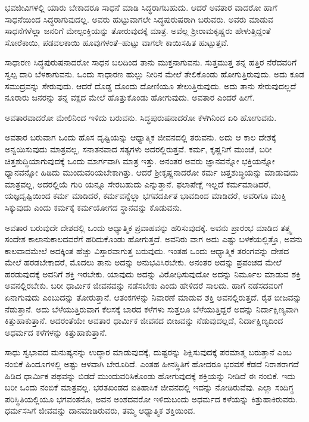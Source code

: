 ಭವಜೀವಿಗಳಲ್ಲಿ ಯಾರು ಬೇಕಾದರೂ ಸಾಧನೆ ಮಾಡಿ ಸಿದ್ಧರಾಗಬಹುದು. ಆದರೆ ಅವತಾರ ವಾದರೋ ಹಾಗೆ ಸಾಧನೆಯಿಂದ ಸಿದ್ಧರಾಗುವುದಲ್ಲ. ಅವರು ಹುಟ್ಟುವಾಗಲೇ ಸಿದ್ಧಪುರುಷರಾಗಿ ಬರುವರು. ಅವರು ಮಾಡುವ ಸಾಧನೆಗಳೆಲ್ಲಾ ಜನರಿಗೆ ಮೇಲ್ಪಂಕ್ತಿಯನ್ನು ತೋರುವುದಕ್ಕೆ ಮಾತ್ರ. ಅವೆಲ್ಲ ಶ್ರೀರಾಮಕೃಷ್ಣರು ಹೇಳುತ್ತಿದ್ದಂತೆ ಸೋರೆಕಾಯಿ, ಪಡವಲಕಾಯಿ ಹೂವುಗಳಂತೆ–ಹುಟ್ಟು ವಾಗಲೇ ಕಾಯಿಸಹಿತ ಹುಟ್ಟುತ್ತವೆ.

ಸಾಧಾರಣ ಸಿದ್ಧಪುರುಷನಾದರೋ ಸಾಧನ ಬಲದಿಂದ ತಾನು ಮುಕ್ತನಾಗುವನು. ಸುತ್ತಮುತ್ತ ತನ್ನ ಹತ್ತಿರ ನೆರೆದವರಿಗೆ ಸ್ವಲ್ಪ ದಾರಿ ಬೆಳಕಾಗುವನು. ಒಂದು ಸಾಧಾರಣ ಹುಲ್ಲು ನೀರಿನ ಮೇಲೆ ತೇಲಿಕೊಂಡು ಹೋಗುತ್ತಿರುವುದು. ಅದು ಕೂಡ ಸಮುದ್ರವನ್ನು ಸೇರುವುದು. ಆದರೆ ದೊಡ್ಡ ದೊಂದು ದೋಣಿಯೂ ತೇಲುತ್ತಿರುವುದು. ಅದು ತಾನು ಸೇರುವುದಲ್ಲದೆ ನೂರಾರು ಜನರನ್ನು ತನ್ನ ವಕ್ಷದ ಮೇಲೆ ಹೊತ್ತುಕೊಂಡು ಹೋಗುವುದು. ಅವತಾರ ಎಂದರೆ ಹೀಗೆ.

ಅವತಾರವಾದರೋ ಮೇಲಿನಿಂದ ಇಳಿದು ಬರುವನು. ಸಿದ್ಧಪುರುಷನಾದರೋ ಕೆಳಗಿನಿಂದ ಏರಿ ಹೋಗುವನು.

ಅವತಾರ ಬರುವಾಗ ಒಂದು ಹೊಸ ದೃಷ್ಟಿಯನ್ನು ಆಧ್ಯಾತ್ಮಿಕ ಜೀವನದಲ್ಲಿ ತರುವನು. ಅದು ಆ ಕಾಲ ದೇಶಕ್ಕೆ ಅನ್ವಯಿಸುವುದು ಮಾತ್ರವಲ್ಲ, ಸನಾತನವಾದ ಸತ್ಯಗಳು ಅದರಲ್ಲಿರುತ್ತವೆ. ಕರ್ಮ, ಕೃಷ್ಣನಿಗೆ ಮುಂಚೆ, ಬರೀ ಚಿತ್ತಶುದ್ಧಿಯಾಗುವುದಕ್ಕೆ ಒಂದು ಮಾರ್ಗವಾಗಿ ಮಾತ್ರ ಇತ್ತು. ಅನಂತರ ಅವರು ಜ್ಞಾನವನ್ನೋ ಭಕ್ತಿಯನ್ನೋ ಧ್ಯಾನವನ್ನೋ ಹಿಡಿದು ಮುಂದುವರಿಯಬೇಕಾಗಿತ್ತು. ಆದರೆ ಶ್ರೀಕೃಷ್ಣನಾದರೋ ಕರ್ಮ ಚಿತ್ತಶುದ್ಧಿಯನ್ನು ಮಾಡುವುದು ಮಾತ್ರವಲ್ಲ, ಅದರಲ್ಲಿಯೆ ಗುರಿ ಯನ್ನೂ ಸೇರಬಹುದು ಎನ್ನುತ್ತಾನೆ. ಫಲಾಪೇಕ್ಷೆ ಇಲ್ಲದೆ ಕರ್ಮಮಾಡಿದರೆ, ಯಜ್ಞದೃಷ್ಟಿಯಿಂದ ಕರ್ಮ ಮಾಡಿದರೆ, ಕರ್ಮವನ್ನೆಲ್ಲಾ ಭಗವದರ್ಪಿತ ಭಾವದಿಂದ ಮಾಡಿದರೆ, ಅವರಿಗೂ ಮುಕ್ತಿ ಸಿಕ್ಕುವುದು ಎಂದು ಕರ್ಮಕ್ಕೆ ಕರ್ಮಯೋಗದ ಸ್ಥಾನವನ್ನು ಕೊಡುವನು.

ಅವತಾರ ಬರುವುದೇ ದೇಶದಲ್ಲಿ ಒಂದು ಆಧ್ಯಾತ್ಮಿಕ ಪ್ರವಾಹವನ್ನು ಹರಿಸುವುದಕ್ಕೆ. ಅವನು ಪ್ರಾರಂಭ ಮಾಡಿದ ತತ್ತ್ವ ಸಂದೇಶ ಕಾಲಾನುಕಾಲದವರೆಗೆ ಹರಿದುಕೊಂಡು ಹೋಗುತ್ತದೆ. ಅವನಿರು ವಾಗ ಅದು ಎಷ್ಟು ಬಳಕೆಯಲ್ಲಿತ್ತೊ, ಅವನು ಕಾಲವಾದಮೇಲೆ ಅದಕ್ಕಿಂತ ಹೆಚ್ಚು ವಿಸ್ತಾರವಾಗುತ್ತ ಬರುವುದು. ಇಂತಹ ಒಂದು ಆಧ್ಯಾತ್ಮಿಕ ತರಂಗವನ್ನು ದೇಶದ ಮೇಲೆ ಹರಡಬೇಕಾದರೆ, ಮೊದಲು ತಾನು ಅದನ್ನು ಅನುಭವಿಸಿರಬೇಕು. ಅನಂತರ ಅದನ್ನು ಪ್ರಪಂಚದ ಮೇಲೆ ಹರಡುವುದಕ್ಕೆ ಅವನಿಗೆ ಶಕ್ತಿ ಇರಬೇಕು. ಯಾವುದು ಅದನ್ನು ವಿರೋಧಿಸುವುದೋ ಅದನ್ನು ನಿರ್ಮೂಲ ಮಾಡುವ ಶಕ್ತಿ ಅವನಲ್ಲಿರಬೇಕು. ಬರೀ ಧಾರ್ಮಿಕ ಜೀವನವನ್ನು ನಡೆಸಬೇಕು ಎಂದು ಹೇಳಿದರೆ ಸಾಲದು. ಹಾಗೆ ನಡೆಸದವರಿಗೆ ಏನಾಗುವುದು ಎಂಬುದನ್ನು ತೋರುತ್ತಾನೆ. ಆತಂಕಗಳನ್ನು ನಿವಾರಣೆ ಮಾಡುವ ಶಕ್ತಿ ಅವನಲ್ಲಿರುತ್ತದೆ. ರೈತ ಬೀಜವನ್ನು ನೆಡುತ್ತಾನೆ. ಅದು ಬೆಳೆಯುತ್ತಿರುವಾಗ ಕೆಲಸಕ್ಕೆ ಬಾರದ ಕಳೆಗಳು ಸುತ್ತಲೂ ಬೆಳೆಯುತ್ತಿದ್ದರೆ ಅದನ್ನು ನಿರ್ದಾಕ್ಷಿಣ್ಯವಾಗಿ ಕಿತ್ತುಹಾಕುತ್ತಾನೆ. ಅದರಂತೆಯೇ ಅವತಾರ ಧಾರ್ಮಿಕ ಜೀವನದ ಬೀಜವನ್ನು ನೆಡುವುದಲ್ಲದೆ, ನಿರ್ದಾಕ್ಷಿಣ್ಯದಿಂದ ಅಧರ್ಮದ ಕಳೆಗಳನ್ನು ಕಿತ್ತುಹಾಕುತ್ತಾನೆ.

ಸಾಧು ಸ್ವಭಾವದ ಮನುಷ್ಯನನ್ನು ಉದ್ಧಾರ ಮಾಡುವುದಕ್ಕೆ, ದುಷ್ಟರನ್ನು ಶಿಕ್ಷಿಸುವುದಕ್ಕೆ ಪರಮಾತ್ಮ ಬರುತ್ತಾನೆ ಎಂಬ ನಂಬಿಕೆ ಹಿಂದೂಗಳಲ್ಲಿ ಅಷ್ಟು ಆಳವಾಗಿ ಬೇರೂರಿದೆ. ಎಂತಹ ಹೀನಸ್ಥಿತಿಗೆ ಹೋದರೂ ಭರವಸೆ ಕೆಡದೆ ನಿರಾಶರಾಗದೆ ಹಿಡಿದ ಧಾರ್ಮಿಕ ಪಥವನ್ನು ಬಿಡದೆ ಮುಂದುವರಿಸಿಕೊಂಡು ಹೋಗುವುದಕ್ಕೆ ಶಕ್ತಿಯನ್ನು ನೀಡಿದೆ ಈ ನಂಬಿಕೆ. ಇದು ಬರೀ ಒಂದು ನಂಬಿಕೆ ಮಾತ್ರವಲ್ಲ. ಭರತಖಂಡದ ಐತಿಹಾಸಿಕ ಜೀವನದಲ್ಲಿ ಇದನ್ನು ನೋಡಿರುವೆವು. ಎಲ್ಲಾ ಸಂದಿಗ್ಧ ಪರಿಸ್ಥಿತಿಯಲ್ಲಿಯೂ ಭಗವಂತನೊ, ಅವನ ಅಂಶದವರೋ ಇಳಿದುಬಂದು ಅಧರ್ಮದ ಕಳೆಯನ್ನು ಕಿತ್ತುಹಾಕಿರುವರು. ಧರ್ಮಸಸಿಗೆ ಜೀವವನ್ನು ದಾನಮಾಡಿರುವರು, ತಮ್ಮ ಆಧ್ಯಾತ್ಮಿಕ ಶಕ್ತಿಯಿಂದ.

